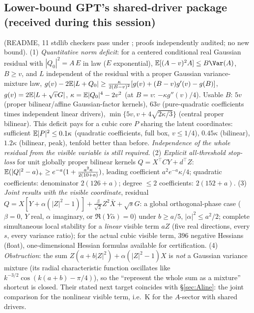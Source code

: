 \subsection{Lower-bound GPT's shared-driver package (received during this session)}\label{sec:shareddriver}
 (README, 11 stdlib checkers pass under ; proofs independently audited; no new bound).
(1) \emph{Quantitative norm deficit}: for a centered conditional real Gaussian residual with $|Q_0|^2=A\,E$ in law ($E$ exponential), $\E[(A-v)^2A]\le B\Var(A)$, $B\ge v$, and $L$
independent of the residual with a proper Gaussian variance-mixture law,
$g(v)-2\mathbb E|L+Q_0|\ge\frac{\kappa}{2(B-v)^2}[g(v)+(B-v)g'(v)-g(B)]$, $g(v)=2\mathbb E|L+\sqrt vG|$, $\kappa=\mathbb E|Q_0|^4-2v^2$ (at $B=v$: $-\kappa g''(v)/4$). Usable $B$: $5v$ (proper
bilinear/affine Gaussian-factor kernels), $63v$ (pure-quadratic coefficients times independent linear drivers), $\min\{5v,v+4\sqrt{2\kappa/3}\}$ (central proper bilinear).
This deficit pays for a cubic core $P$ sharing the latent coordinates: sufficient $\mathbb E|P|^2\le0.1\kappa$ (quadratic coefficients, full box, $v\le1/4$), $0.45\kappa$ (bilinear),
$1.2\kappa$ (bilinear, peak), tenfold better than before. \emph{Independence of the whole residual from the visible variable is still required.}
(2) \emph{Explicit all-threshold stop-loss} for unit globally proper bilinear kernels $Q=X^{\top}CY+d^{\top}Z$: $\mathbb E(|Q|^2-a)_+\ge e^{-a}(1+\frac{a^2\kappa}{2(10+a)})$, leading
coefficient $a^2e^{-a}\kappa/4$; quadratic coefficients: denominator $2(126+a)$; degree $\le2$ coefficients: $2(152+a)$.
(3) \emph{Joint results with the visible coordinate}, residual $Q=X[Y+\alpha(|Z|^2-1)]+\frac\beta{\sqrt2}Z^2\bar X+\sqrt sG$: a global orthogonal-phase case ($\beta=0$, $Y$ real,
$\alpha$ imaginary, or $\Re(Y\bar\alpha)=0$) under $b\ge a/5$, $|\alpha|^2\le a^2/2$; complete simultaneous local stability for a \emph{linear} visible term $aZ$ (five real
directions, every $s$, every variance ratio); for the actual cubic visible term, 396 negative Hessians (float), one-dimensional Hessian formulas available for certification.
(4) \emph{Obstruction}: the sum $Z(a+b|Z|^2)+\alpha(|Z|^2-1)X$ is \emph{not} a Gaussian variance mixture (its radial characteristic function oscillates like
$k^{-3/2}\cos(k(a+b)-\pi/4)$), so the ``represent the whole sum as a mixture'' shortcut is closed. Their stated next target coincides with \S\ref{sec:Aline}: the joint comparison for
the nonlinear visible term, i.e.\ K for the $A$-sector with shared drivers.


